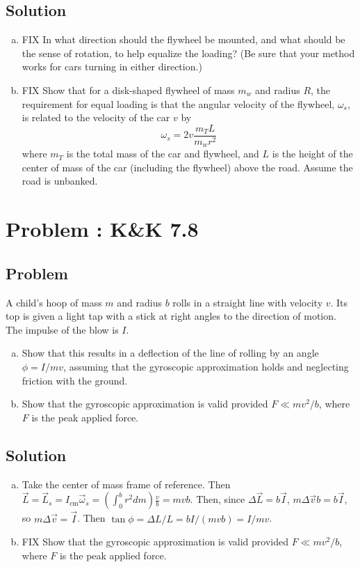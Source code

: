 \documentclass[solutions]{esg8012pset}
\begin{document}
\subsection{Solution}
\begin{enumerate}[(a)]
  \item FIX In what direction should the flywheel be mounted, and what should be the sense of rotation, to help equalize the loading? (Be sure that your method works for cars turning in either direction.)
  \item FIX Show that for a disk-shaped flywheel of mass $m_w$ and radius $R$, the requirement for equal loading is that the angular velocity of the flywheel, $\omega_s$, is related to the velocity of the car $v$ by $$\omega_s = 2v\frac{m_T L}{m_w r^2}$$ where $m_T$ is the total mass of the car and flywheel, and $L$ is the height of the center of mass of the car (including the flywheel) above the road. Assume the road is unbanked.
\end{enumerate}
\section{Problem \thesection: K\&K 7.8}
\subsection{Problem}
  A child's hoop of mass $m$ and radius $b$ rolls in a straight line with velocity $v$. Its top is given a light tap with a stick at right angles to the direction of motion. The impulse of the blow is $I$.
  \begin{enumerate}[(a)]
    \item Show that this results in a deflection of the line of rolling by an angle $\phi = I / m v$, assuming that the gyroscopic approximation holds and neglecting friction with the ground.
    \item Show that the gyroscopic approximation is valid provided $F \ll mv^2 / b$, where $F$ is the peak applied force.
  \end{enumerate}
\subsection{Solution}
\begin{enumerate}[(a)]
  \item Take the center of mass frame of reference.  Then $\vec L = \vec  L_s = I_\text{cm}\vec \omega_s = \left(\int_0^b r^2 d m\right) \frac{v}{b} = m v b$.  Then, since ${\Delta \vec L} = b \vec I$, $m\Delta\vec v b = b \vec I$, so $m\Delta\vec v = \vec I$.  Then $\tan\phi = \Delta L / L = b I / (m v b) = I / m v$.
  \item FIX Show that the gyroscopic approximation is valid provided $F \ll mv^2 / b$, where $F$ is the peak applied force.
\end{enumerate}
\end{document}
